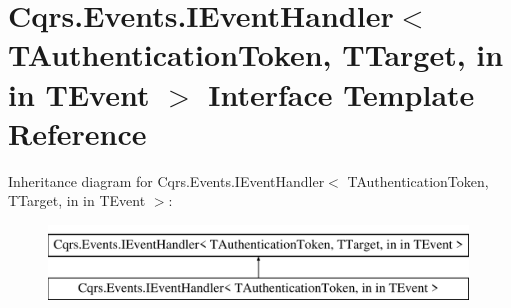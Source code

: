 \hypertarget{interfaceCqrs_1_1Events_1_1IEventHandler}{}\section{Cqrs.\+Events.\+I\+Event\+Handler$<$ T\+Authentication\+Token, T\+Target, in in T\+Event $>$ Interface Template Reference}
\label{interfaceCqrs_1_1Events_1_1IEventHandler}
Inheritance diagram for Cqrs.\+Events.\+I\+Event\+Handler$<$ T\+Authentication\+Token, T\+Target, in in T\+Event $>$\+:\begin{figure}[H]
\begin{center}
\leavevmode
\includegraphics[height=2.000000cm]{interfaceCqrs_1_1Events_1_1IEventHandler}
\end{center}
\end{figure}
